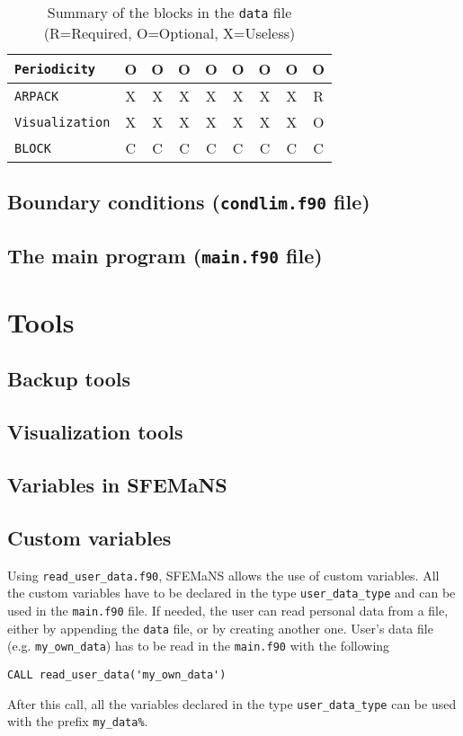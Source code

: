 \documentclass[a4paper]{book}
\begin{document}
\begin{table}[h]
\begin{tabular}{|l|cccccccc|}
\texttt{Periodicity}                   & O & O & O & O & O & O & O & O\\ \hline
\texttt{ARPACK}                        & X & X & X & X & X & X & X & R\\ \hline
\texttt{Visualization}                 & X & X & X & X & X & X & X & O\\ \hline
\texttt{BLOCK}                         & C & C & C & C & C & C & C & C\\ \hline
\end{tabular}
\caption{Summary of the blocks in the \texttt{data} file (R=Required, O=Optional, X=Useless)}
\label{tab:data_blocks}
\end{table}

\section{Boundary conditions (\texttt{condlim.f90} file)}

\section{The main program (\texttt{main.f90} file)}

\chapter{Tools}
\section{Backup tools}
\section{Visualization tools}
\section{Variables in SFEMaNS}
\section{Custom variables}
Using \texttt{read\_user\_data.f90}, SFEMaNS allows the use of custom variables. All the custom variables have to be declared in the type \texttt{user\_data\_type} and can be used in the \texttt{main.f90} file. If needed, the user can read personal data from a file, either by appending the \texttt{data} file, or by creating another one. User's data file (e.g. \texttt{my\_own\_data}) has to be read in the \texttt{main.f90} with the following
\begin{verbatim}
CALL read_user_data('my_own_data')
\end{verbatim}
After this call, all the variables declared in the type \texttt{user\_data\_type} can be used with the prefix \verb?my_data%?.
\end{document}
